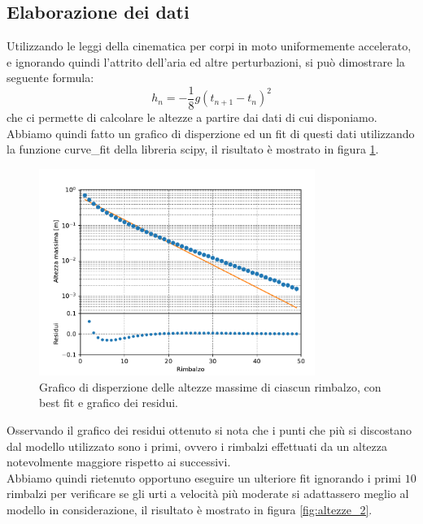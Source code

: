 \documentclass[a4paper]{article}
\begin{document}
    \subsection{Elaborazione dei dati}
    Utilizzando le leggi della cinematica per corpi in moto uniformemente accelerato,
    e ignorando quindi l'attrito dell'aria ed altre perturbazioni, si può dimostrare la
    seguente formula:
    \begin{equation}
        \label{eq:altezza 2}
        h_n=-\frac{1}{8}g\left( t_{n+1}-t_{n} \right) ^2
    \end{equation}
    che ci permette di calcolare le altezze a partire dai dati di cui disponiamo.\\
    Abbiamo quindi fatto un grafico di disperzione ed un fit di questi dati utilizzando
    la funzione curve\_fit della libreria scipy, il risultato è mostrato in figura \ref{fig:altezze}.
    \begin{figure}[ht!]
        \centering
        \includegraphics[width=0.8\textwidth]{extra/altezza_rimbalzi.pdf}
        \caption{Grafico di disperzione delle altezze massime di ciascun rimbalzo,
        con best fit e grafico dei residui.}
        \label{fig:altezze}
    \end{figure}
    Osservando il grafico dei residui ottenuto si nota che i punti che più si discostano
    dal modello utilizzato sono i primi, ovvero i rimbalzi effettuati da un altezza 
    notevolmente maggiore rispetto ai successivi.\\
    Abbiamo quindi rietenuto opportuno eseguire un ulteriore fit ignorando i primi $10$ rimbalzi
    per verificare se gli urti a velocità più moderate si adattassero meglio al modello
    in considerazione, il risultato è mostrato in figura \ref{fig:altezze_2}.\\
\end{document}
